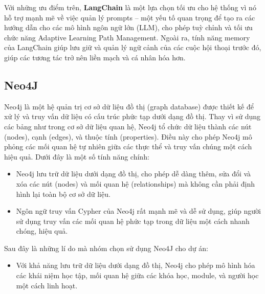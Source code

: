 Với những ưu điểm trên, \textbf{LangChain} là một lựa chọn tối ưu cho hệ thống vì nó hỗ trợ mạnh mẽ về việc quản lý prompts – một yếu tố quan trọng để tạo ra các hướng dẫn cho các mô hình ngôn ngữ lớn (LLM), cho phép tuỳ chỉnh và tối ưu chức năng Adaptive Learning Path Management. Ngoài ra, tính năng memory của LangChain giúp lưu giữ và quản lý ngữ cảnh của các cuộc hội thoại trước đó, giúp các tương tác trở nên liền mạch và cá nhân hóa hơn.
\subsection{Neo4J}
Neo4j là một hệ quản trị cơ sở dữ liệu đồ thị (graph database) được thiết kế để xử lý và truy vấn dữ liệu có cấu trúc phức tạp dưới dạng đồ thị. Thay vì sử dụng các bảng như trong cơ sở dữ liệu quan hệ, Neo4j tổ chức dữ liệu thành các nút (nodes), cạnh (edges), và thuộc tính (properties). Điều này cho phép Neo4j mô phỏng các mối quan hệ tự nhiên giữa các thực thể và truy vấn chúng một cách hiệu quả. Dưới đây là một số tính năng chính:
\begin{itemize}
    \item Neo4j lưu trữ dữ liệu dưới dạng đồ thị, cho phép dễ dàng thêm, sửa đổi và xóa các nút (nodes) và mối quan hệ (relationships) mà không cần phải định hình lại toàn bộ cơ sở dữ liệu.
    \item Ngôn ngữ truy vấn Cypher của Neo4j rất mạnh mẽ và dễ sử dụng, giúp người sử dụng truy vấn các mối quan hệ phức tạp trong dữ liệu một cách nhanh chóng, hiệu quả.
\end{itemize}
Sau đây là những lí do mà nhóm chọn sử dụng Neo4J cho dự án:
\begin{itemize}
    \item Với khả năng lưu trữ dữ liệu dưới dạng đồ thị, Neo4j cho phép mô hình hóa các khái niệm học tập, mối quan hệ giữa các khóa học, module, và người học một cách linh hoạt.
    
\end{itemize}
